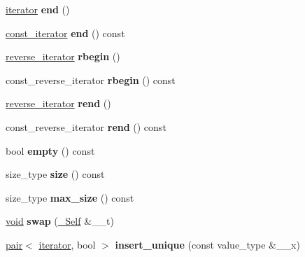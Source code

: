 \begin{DoxyCompactItemize}
\hyperlink{struct___rb__tree__iterator}{iterator} {\bfseries end} ()
\item 
\mbox{\label{class___rb__tree_aedcacd0394e44e888b48f680db4a5e39}} 
\hyperlink{struct___rb__tree__iterator}{const\+\_\+iterator} {\bfseries end} () const
\item 
\mbox{\label{class___rb__tree_a61186b3ac3df38f4e47235389b290d8b}} 
\hyperlink{classreverse__iterator}{reverse\+\_\+iterator} {\bfseries rbegin} ()
\item 
\mbox{\label{class___rb__tree_a1bca0b075ac4d40e7483b9cbfea4a41d}} 
const\+\_\+reverse\+\_\+iterator {\bfseries rbegin} () const
\item 
\mbox{\label{class___rb__tree_a14167a8ba8e81d5a47051f36bf0cbfa6}} 
\hyperlink{classreverse__iterator}{reverse\+\_\+iterator} {\bfseries rend} ()
\item 
\mbox{\label{class___rb__tree_a3e8e88b085e12867ef46c774b6e442e1}} 
const\+\_\+reverse\+\_\+iterator {\bfseries rend} () const
\item 
\mbox{\label{class___rb__tree_af6b577cf9ef2e4b93faa875b653fb3d2}} 
bool {\bfseries empty} () const
\item 
\mbox{\label{class___rb__tree_a39c6e6ca9210e2b95577239b30c35be4}} 
size\+\_\+type {\bfseries size} () const
\item 
\mbox{\label{class___rb__tree_aed335a7da1ab20f4194cefaca4525ae2}} 
size\+\_\+type {\bfseries max\+\_\+size} () const
\item 
\mbox{\label{class___rb__tree_a50abd1f75a8b605ae1dd9b71ea57f17d}} 
\hyperlink{interfacevoid}{void} {\bfseries swap} (\hyperlink{class___rb__tree}{\+\_\+\+Self} \&\+\_\+\+\_\+t)
\item 
\mbox{\label{class___rb__tree_a9c3341e15daa1b6565adb48129b2999b}} 
\hyperlink{structpair}{pair}$<$ \hyperlink{struct___rb__tree__iterator}{iterator}, bool $>$ {\bfseries insert\+\_\+unique} (const value\+\_\+type \&\+\_\+\+\_\+x)

\end{DoxyCompactItemize}
